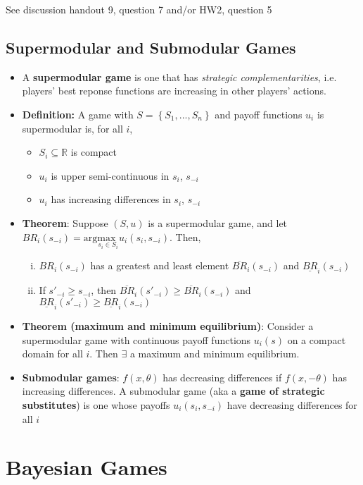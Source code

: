\documentclass{article}
\newcommand{\R}{\mathbb{R}}
\newcommand{\red}[1]{{\color{red}#1}}
\begin{document}
\red{See discussion handout 9, question 7 and/or HW2, question 5}

\subsection{Supermodular and Submodular Games}
\begin{itemize}
	\item A \textbf{supermodular game} is one that has \textit{strategic complementarities}, i.e. players' best reponse functions are increasing in other players' actions.
	\item \textbf{Definition:} A game with ${S=\left\{S_1,...,S_n\right\}}$ and payoff functions $u_i$ is supermodular is, for all $i$,
		\begin{itemize}
			\item $S_i\subseteq\R$ is compact 
			\item $u_i$ is upper semi-continuous in $s_i$, $s_{-i}$
			\item $u_i$ has increasing differences in $s_i$, $s_{-i}$
		\end{itemize}
	\item \textbf{Theorem}: Suppose $(S,u)$ is a supermodular game, and let ${BR_i(s_{-i})=\text{arg}\underset{s_i\in S_i}{\text{max }}u_i(s_i,s_{-i})}$. Then,
		\begin{enumerate}[(i)]
			\item $BR_i(s_{-i})$ has a greatest and least element $\overline{BR}_i(s_{-i})$ and $\underline{BR}_i(s_{-i})$
			\item If ${s'_{-i}\geq s_{-i}}$, then ${\overline{BR}_i(s'_{-i})\geq\overline{BR}_i(s_{-i})}$ and ${\underline{BR}_i(s'_{-i})\geq\underline{BR}_i(s_{-i})}$
		\end{enumerate}
	\item \textbf{Theorem (maximum and minimum equilibrium)}: Consider a supermodular game with continuous payoff functions $u_i(s)$ on a compact domain for all $i$. Then $\exists$ a maximum and minimum equilibrium.
	\item \textbf{Submodular games}: $f(x,\theta)$ has decreasing differences if $f(x,-\theta)$ has increasing differences. A submodular game (aka a \textbf{game of strategic substitutes}) is one whose payoffs $u_i(s_i,s_{-i})$ have decreasing differences for all $i$
\end{itemize}



\section{Bayesian Games}
\end{document}
